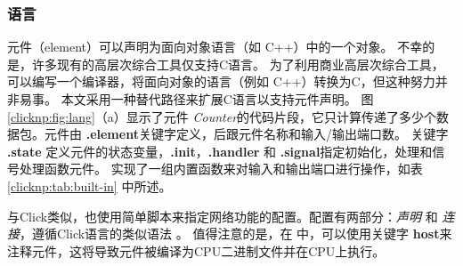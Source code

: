 \subsubsection{语言}

\name 元件（element）可以声明为面向对象语言（如 C++）中的一个对象。
不幸的是，许多现有的高层次综合工具仅支持C语言。
为了利用商业高层次综合工具，可以编写一个编译器，将面向对象的语言（例如 C++）转换为C，但这种努力并非易事。
本文采用一种替代路径来扩展C语言以支持元件声明。
图 \ref {clicknp:fig:lang}（a）显示了元件 \textit {Counter}的代码片段，它只计算传递了多少个数据包。元件由 \textbf {.element}关键字定义，后跟元件名称和输入/输出端口数。
关键字 \textbf {.state} 定义元件的状态变量，\textbf {.init}，\textbf {.handler} 和 \textbf {.signal}指定初始化，处理和信号处理函数元件。
实现了一组内置函数来对输入和输出端口进行操作，如表 \ref {clicknp:tab:built-in} 中所述。

与Click类似，\name 也使用简单脚本来指定网络功能的配置。配置有两部分：\textit {声明} 和 \textit {连接}，遵循Click语言的类似语法 \cite {kohler2000click}。
值得注意的是，在 \name 中，可以使用关键字 \textbf {host}来注释元件，这将导致元件被编译为CPU二进制文件并在CPU上执行。

\begin{table}

\centering
\caption{\name\ 管道上的内置操作。}
\label{clicknp:tab:built-in}
\end{table}

